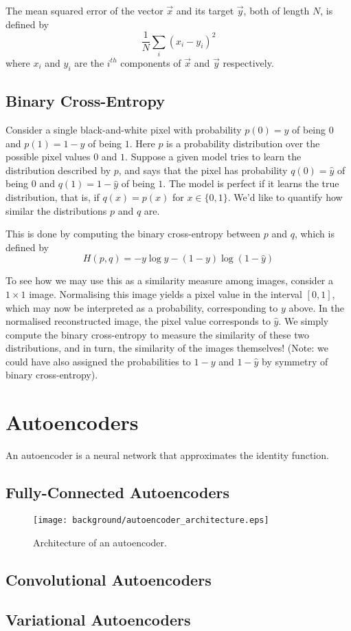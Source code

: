 The mean squared error of the vector $\vec{x}$ and its target $\vec{y}$, both of length $N$, is defined by $$\frac{1}{N}\sum_{i}(x_i - y_i)^2$$ where $x_i$ and $y_i$ are the $i^{th}$ components of $\vec{x}$ and $\vec{y}$ respectively.

\subsection{Binary Cross-Entropy}
Consider a single black-and-white pixel with probability $p(0) = y$ of being $0$ and $p(1) = 1 - y$ of being $1$. Here $p$ is a probability distribution over the possible pixel values $0$ and $1$. Suppose a given model tries to learn the distribution described by $p$, and says that the pixel has probability $q(0) = \hat{y}$ of being $0$ and $q(1) = 1 - \hat{y}$ of being $1$. The model is perfect if it learns the true distribution, that is, if $q(x) = p(x)$ for $x\in\{0,1\}$. We'd like to quantify how similar the distributions $p$ and $q$ are.

This is done by computing the binary cross-entropy between $p$ and $q$, which is defined by $$H(p,q) = -y\log\hat{y} - (1-y)\log(1-\hat{y})$$

To see how we may use this as a similarity measure among images, consider a $1\times1$ image. Normalising this image yields a pixel value in the interval $[0, 1]$, which may now be interpreted as a probability, corresponding to $y$ above. In the normalised reconstructed image, the pixel value corresponds to $\hat{y}$. We simply compute the binary cross-entropy to measure the similarity of these two distributions, and in turn, the similarity of the images themselves! (Note: we could have also assigned the probabilities to $1-y$ and $1-\hat{y}$ by symmetry of binary cross-entropy).


\section{Autoencoders}

An autoencoder is a neural network that approximates the identity function.

\subsection{Fully-Connected Autoencoders}

\begin{figure}[h!]
\centering
\texttt{[image: background/autoencoder\_architecture.eps]}
\caption{Architecture of an autoencoder.}
\end{figure}

\subsection{Convolutional Autoencoders}

\subsection{Variational Autoencoders}